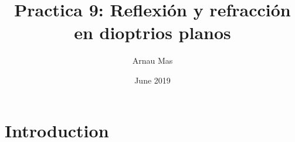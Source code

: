 \documentclass{article}
\title{Practica 9: Reflexión y refracción en dioptrios planos}
\author{Arnau Mas}
\date{June 2019}
\begin{document}
\maketitle

\section{Introduction}
\end{document}
